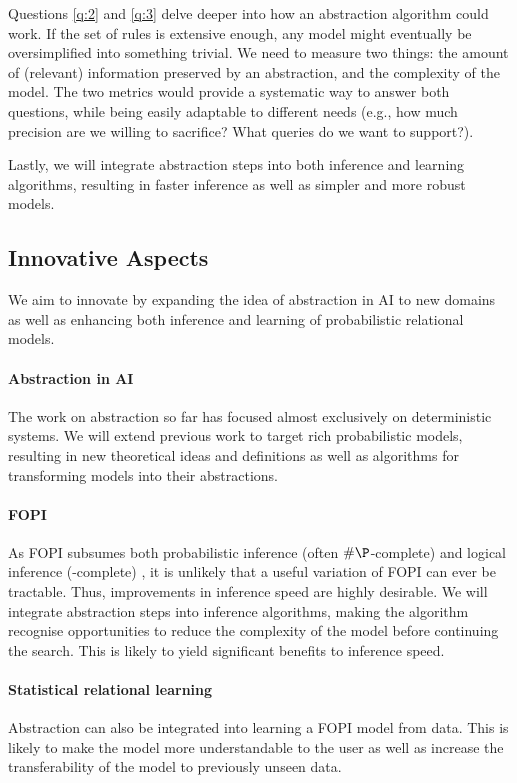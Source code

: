 \documentclass[11pt,english,twocolumn]{article}
\begin{document}
Questions \ref{q:2} and \ref{q:3} delve deeper into how an abstraction algorithm
could work. If the set of rules is extensive enough, any model might
eventually be oversimplified into something trivial. We need to measure two
things: the amount of (relevant) information preserved by an abstraction, and
the complexity of the model. The two metrics would provide a systematic way to
answer both questions, while being easily adaptable to different needs (e.g.,
how much precision are we willing to sacrifice? What queries do we want to
support?).

Lastly, we will integrate abstraction steps into both inference and learning
algorithms, resulting in faster inference as well as simpler and more robust
models.

\subsection*{Innovative Aspects} %

We aim to innovate by expanding the idea of abstraction in AI to new domains as
well as enhancing both inference and learning of probabilistic relational
models.

\paragraph{Abstraction in AI} The work on abstraction so far has focused almost
exclusively on deterministic systems. We will extend previous work to target
rich probabilistic models, resulting in new theoretical ideas and definitions as
well as algorithms for transforming models into their abstractions.

\paragraph{FOPI} As FOPI subsumes both probabilistic inference (often
$\#\P$-complete) and logical inference (\NP-complete)
\cite{DBLP:journals/ml/RichardsonD06}, it is unlikely that a useful variation of
FOPI can ever be tractable. Thus, improvements in inference speed are highly
desirable. We will integrate abstraction steps into inference algorithms,
making the algorithm recognise opportunities to reduce the complexity of the
model before continuing the search. This is likely to yield significant benefits
to inference speed.

\paragraph{Statistical relational learning} Abstraction can also be integrated
into learning a FOPI model from data. This is likely to make the model more
understandable to the user as well as increase the transferability of the model
to previously unseen data.
\end{document}

